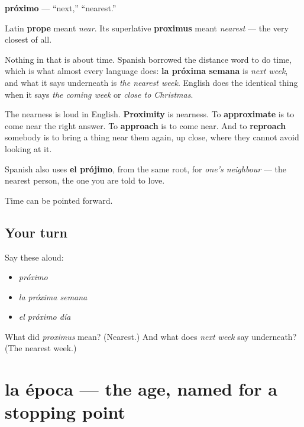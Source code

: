 \begin{cousinweb}
\textbf{próximo} — \textquotedblleft{}next,\textquotedblright{} \textquotedblleft{}nearest.\textquotedblright{}

Latin \textbf{prope} meant \emph{near}. Its superlative \textbf{proximus} meant \emph{nearest} — the very closest of all.

Nothing in that is about time. Spanish borrowed the distance word to do time, which is what almost every language does: \textbf{la próxima semana} is \emph{next week}, and what it says underneath is \emph{the nearest week}. English does the identical thing when it says \emph{the coming week} or \emph{close to Christmas}.

The nearness is loud in English. \textbf{Proximity} is nearness. To \textbf{approximate} is to come near the right answer. To \textbf{approach} is to come near. And to \textbf{reproach} somebody is to bring a thing near them again, up close, where they cannot avoid looking at it.

Spanish also uses \textbf{el prójimo}, from the same root, for \emph{one's neighbour} — the nearest person, the one you are told to love.
\end{cousinweb}

\begin{grammarlens}[title={What you've built}]
Time can be pointed forward.
\end{grammarlens}

\subsection*{Your turn}
Say these aloud:

\begin{itemize}
\raggedright
  \item \emph{próximo}
  \item \emph{la próxima semana}
  \item \emph{el próximo día}
\end{itemize}

\begin{tcolorbox}[breakable,colback=teal!4,colframe=teal!35!black,title={Before you move on}]
What did \emph{proximus} mean? (Nearest.) And what does \emph{next week} say underneath? (The nearest week.)
\end{tcolorbox}
\section[la época]{la época — the age, named for a stopping point}

